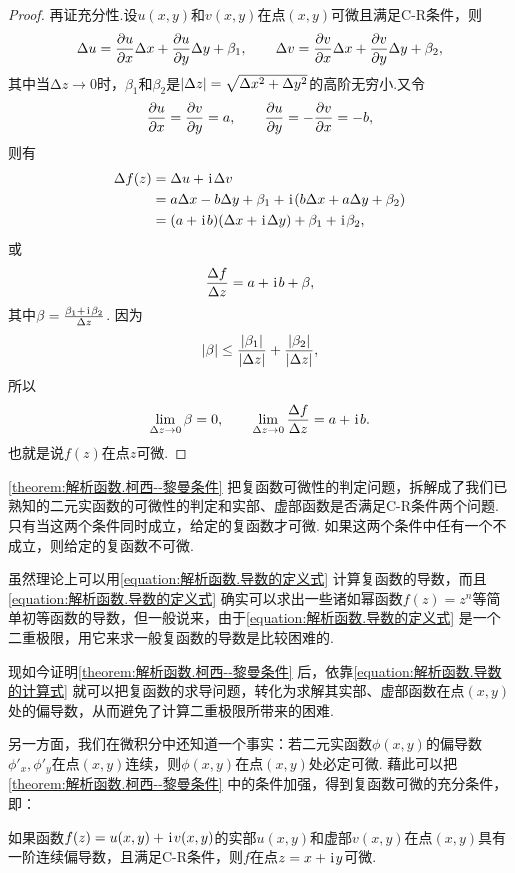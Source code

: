 \begin{theorem}
\begin{proof}
再证充分性.设\(u(x,y)\)和\(v(x,y)\)在点\((x,y)\)可微且满足C-R条件，则\[
\Delta u = \pdv{u}{x} \Delta x + \pdv{u}{y} \Delta y + \beta_1,
\qquad
\Delta v = \pdv{v}{x} \Delta x + \pdv{v}{y} \Delta y + \beta_2,
\]其中当\(\increment z\to0\)时，\(\beta_1\)和\(\beta_2\)是\(\abs{\Delta z} = \sqrt{\Delta x^2 + \Delta y^2}\)的高阶无穷小.又令\[
\pdv{u}{x} = \pdv{v}{y} = a,
\qquad
\pdv{u}{y} = -\pdv{v}{x} = -b,
\]则有\begin{align*}
\Delta f(z) &= \Delta u + \kern1pt\mathrm{i}\kern1pt \Delta v \\
&= a \Delta x - b \Delta y + \beta_1 + \kern1pt\mathrm{i}\kern1pt (b \Delta x + a \Delta y + \beta_2) \\
&= (a+\kern1pt\mathrm{i}\kern1pt b)(\Delta x + \kern1pt\mathrm{i}\kern1pt \Delta y) + \beta_1 + \kern1pt\mathrm{i}\kern1pt \beta_2,
\end{align*}或\[
\frac{\Delta f}{\Delta z} = a + \kern1pt\mathrm{i}\kern1pt b + \beta,
\]其中\(\beta = \frac{\beta_1 + \kern1pt\mathrm{i}\kern1pt \beta_2}{\Delta z}\).
因为\[
\abs{\beta} \leq
\frac{\abs{\beta_1}}{\abs{\Delta z}} + \frac{\abs{\beta_2}}{\abs{\Delta z}},
\]所以\[
\lim_{\Delta z\to0} \beta = 0,
\qquad
\lim_{\Delta z\to0} \frac{\Delta f}{\Delta z} = a+\kern1pt\mathrm{i}\kern1pt b.
\]
也就是说\(f(z)\)在点\(z\)可微.
\end{proof}
\end{theorem}

\cref{theorem:解析函数.柯西--黎曼条件} 把复函数可微性的判定问题，拆解成了我们已熟知的二元实函数的可微性的判定和实部、虚部函数是否满足C-R条件两个问题.
只有当这两个条件同时成立，给定的复函数才可微.
如果这两个条件中任有一个不成立，则给定的复函数不可微.

虽然理论上可以用\cref{equation:解析函数.导数的定义式} 计算复函数的导数，而且\cref{equation:解析函数.导数的定义式} 确实可以求出一些诸如幂函数\(f(z) = z^n\)等简单初等函数的导数，但一般说来，由于\cref{equation:解析函数.导数的定义式} 是一个二重极限，用它来求一般复函数的导数是比较困难的.

现如今证明\cref{theorem:解析函数.柯西--黎曼条件} 后，依靠\cref{equation:解析函数.导数的计算式} 就可以把复函数的求导问题，转化为求解其实部、虚部函数在点\((x,y)\)处的偏导数，从而避免了计算二重极限所带来的困难.

另一方面，我们在微积分中还知道一个事实：若二元实函数\(\phi(x,y)\)的偏导数\(\phi'_x,\phi'_y\)在点\((x,y)\)连续，则\(\phi(x,y)\)在点\((x,y)\)处必定可微.
藉此可以把\cref{theorem:解析函数.柯西--黎曼条件} 中的条件加强，得到复函数可微的充分条件，即：
\begin{theorem}\label{theorem:解析函数.复函数可微的充分条件}
如果函数\(f(z)=u(x,y)+\kern1pt\mathrm{i}\kern1pt v(x,y)\)的实部\(u(x,y)\)和虚部\(v(x,y)\)在点\((x,y)\)具有一阶连续偏导数，且满足C-R条件，则\(f\)在点\(z=x+\kern1pt\mathrm{i}\kern1pt y\)可微.
\end{theorem}

